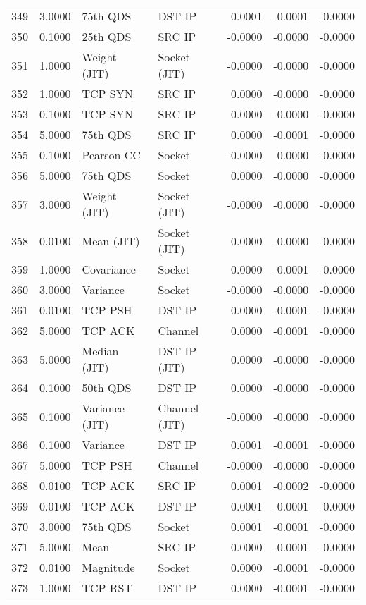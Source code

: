 \begin{longtable}{lrllrrr}
349 & 3.0000 & 75th QDS & DST IP & 0.0001 & -0.0001 & -0.0000 \\
350 & 0.1000 & 25th QDS & SRC IP & -0.0000 & -0.0000 & -0.0000 \\
351 & 1.0000 & Weight (JIT) & Socket (JIT) & -0.0000 & -0.0000 & -0.0000 \\
352 & 1.0000 & TCP SYN & SRC IP & 0.0000 & -0.0000 & -0.0000 \\
353 & 0.1000 & TCP SYN & SRC IP & 0.0000 & -0.0000 & -0.0000 \\
354 & 5.0000 & 75th QDS & SRC IP & 0.0000 & -0.0001 & -0.0000 \\
355 & 0.1000 & Pearson CC & Socket & -0.0000 & 0.0000 & -0.0000 \\
356 & 5.0000 & 75th QDS & Socket & 0.0000 & -0.0000 & -0.0000 \\
357 & 3.0000 & Weight (JIT) & Socket (JIT) & -0.0000 & -0.0000 & -0.0000 \\
358 & 0.0100 & Mean (JIT) & Socket (JIT) & 0.0000 & -0.0000 & -0.0000 \\
359 & 1.0000 & Covariance & Socket & 0.0000 & -0.0001 & -0.0000 \\
360 & 3.0000 & Variance & Socket & -0.0000 & -0.0000 & -0.0000 \\
361 & 0.0100 & TCP PSH & DST IP & 0.0000 & -0.0001 & -0.0000 \\
362 & 5.0000 & TCP ACK & Channel & 0.0000 & -0.0001 & -0.0000 \\
363 & 5.0000 & Median (JIT) & DST IP (JIT) & 0.0000 & -0.0000 & -0.0000 \\
364 & 0.1000 & 50th QDS & DST IP & 0.0000 & -0.0000 & -0.0000 \\
365 & 0.1000 & Variance (JIT) & Channel (JIT) & -0.0000 & -0.0000 & -0.0000 \\
366 & 0.1000 & Variance & DST IP & 0.0001 & -0.0001 & -0.0000 \\
367 & 5.0000 & TCP PSH & Channel & -0.0000 & -0.0000 & -0.0000 \\
368 & 0.0100 & TCP ACK & SRC IP & 0.0001 & -0.0002 & -0.0000 \\
369 & 0.0100 & TCP ACK & DST IP & 0.0001 & -0.0001 & -0.0000 \\
370 & 3.0000 & 75th QDS & Socket & 0.0001 & -0.0001 & -0.0000 \\
371 & 5.0000 & Mean & SRC IP & 0.0000 & -0.0001 & -0.0000 \\
372 & 0.0100 & Magnitude & Socket & 0.0000 & -0.0001 & -0.0000 \\
373 & 1.0000 & TCP RST & DST IP & 0.0000 & -0.0001 & -0.0000 \\

\end{longtable}
